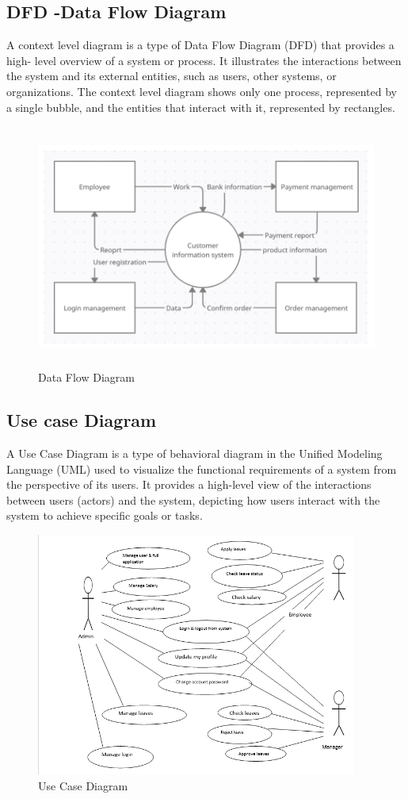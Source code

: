 \subsection{DFD -Data Flow Diagram}
A context level diagram is a type of Data Flow Diagram (DFD) that provides a high-
level overview of a system or process. It illustrates the interactions between the
system and its external entities, such as users, other systems, or organizations. The
context level diagram shows only one process, represented by a single bubble, and
the entities that interact with it, represented by rectangles.
\begin{figure}[h]
    \centering
    \includegraphics[height=8cm]{img/dfd.png}
    \caption{Data Flow Diagram}
    \label{fig:dfd}
\end{figure}
\newpage
\subsection{Use case Diagram}
A Use Case Diagram is a type of behavioral diagram in the Unified Modeling Language
(UML) used to visualize the functional requirements of a system from the perspective
of its users. It provides a high-level view of the interactions between users (actors)
and the system, depicting how users interact with the system to achieve specific goals
or tasks.
\begin{figure}[h]
    \centering
    \includegraphics[height=8cm]{img/usecase.png}
    \caption{Use Case Diagram}
    \label{fig:enter-label}
\end{figure}
\newpage
